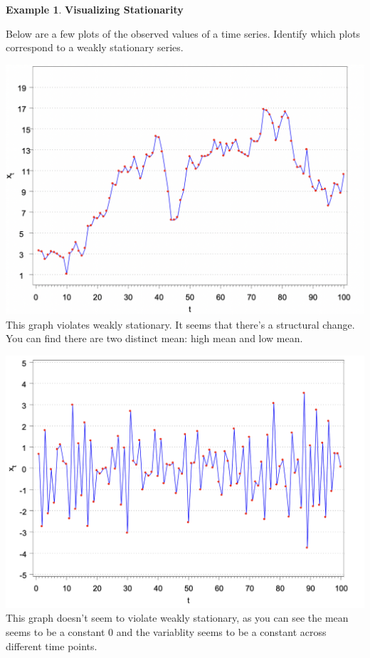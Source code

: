 \documentclass[
]{book}
\theoremstyle{definition}
\theoremstyle{definition}
\newtheorem{example}{Example}[chapter]
\theoremstyle{definition}
\theoremstyle{definition}
\theoremstyle{remark}
\begin{document}
\begin{example}
\textbf{Visualizing Stationarity}

Below are a few plots of the observed values of a time series. Identify which plots correspond to a weakly stationary series.

\includegraphics{Stationarity-graph1.png}
This graph violates weakly stationary. It seems that there's a structural change. You can find there are two distinct mean: high mean and low mean.

\includegraphics{Stationarity-graph2.png}
This graph doesn't seem to violate weakly stationary, as you can see the mean seems to be a constant 0 and the variablity seems to be a constant across different time points.


\end{example}
\end{document}
